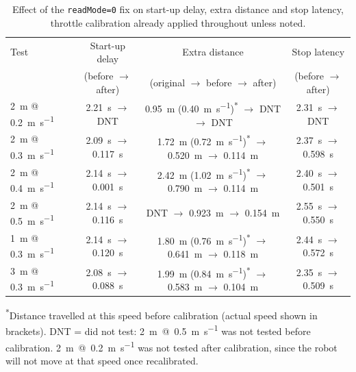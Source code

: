 \begin{table}[htbp]
  \centering
  \caption{Effect of the \texttt{readMode=0} fix on start-up delay, extra distance and stop latency, throttle calibration already applied throughout unless noted.}
  \label{tab:readmode-fix}
  \begin{tabular}{@{}lccc@{}}
    \toprule
    Test & Start-up delay & Extra distance & Stop latency \\
    & (before $\to$ after) & (original $\to$ before $\to$ after) & (before $\to$ after) \\
    \midrule
    \SI{2}{\meter} @ \SI{0.2}{\meter\per\second} & \SI{2.21}{\second} $\to$ DNT & \SI{0.95}{\meter} (\SI{0.40}{\meter\per\second})\textsuperscript{*} $\to$ DNT $\to$ DNT & \SI{2.31}{\second} $\to$ DNT \\
    \SI{2}{\meter} @ \SI{0.3}{\meter\per\second} & \SI{2.09}{\second} $\to$ \SI{0.117}{\second} & \SI{1.72}{\meter} (\SI{0.72}{\meter\per\second})\textsuperscript{*} $\to$ \SI{0.520}{\meter} $\to$ \SI{0.114}{\meter} & \SI{2.37}{\second} $\to$ \SI{0.598}{\second} \\
    \SI{2}{\meter} @ \SI{0.4}{\meter\per\second} & \SI{2.14}{\second} $\to$ \SI{0.001}{\second} & \SI{2.42}{\meter} (\SI{1.02}{\meter\per\second})\textsuperscript{*} $\to$ \SI{0.790}{\meter} $\to$ \SI{0.114}{\meter} & \SI{2.40}{\second} $\to$ \SI{0.501}{\second} \\
    \SI{2}{\meter} @ \SI{0.5}{\meter\per\second} & \SI{2.14}{\second} $\to$ \SI{0.116}{\second} & DNT $\to$ \SI{0.923}{\meter} $\to$ \SI{0.154}{\meter} & \SI{2.55}{\second} $\to$ \SI{0.550}{\second} \\
    \SI{1}{\meter} @ \SI{0.3}{\meter\per\second} & \SI{2.14}{\second} $\to$ \SI{0.120}{\second} & \SI{1.80}{\meter} (\SI{0.76}{\meter\per\second})\textsuperscript{*} $\to$ \SI{0.641}{\meter} $\to$ \SI{0.118}{\meter} & \SI{2.44}{\second} $\to$ \SI{0.572}{\second} \\
    \SI{3}{\meter} @ \SI{0.3}{\meter\per\second} & \SI{2.08}{\second} $\to$ \SI{0.088}{\second} & \SI{1.99}{\meter} (\SI{0.84}{\meter\per\second})\textsuperscript{*} $\to$ \SI{0.583}{\meter} $\to$ \SI{0.104}{\meter} & \SI{2.35}{\second} $\to$ \SI{0.509}{\second} \\
    \bottomrule
  \end{tabular}

  \vspace{2pt}
  \raggedright\footnotesize\textsuperscript{*}Distance travelled at
  this speed before calibration (actual speed shown in brackets).
  DNT = did not test: \SI{2}{\meter}~@~\SI{0.5}{\meter\per\second}
  was not tested before calibration. \SI{2}{\meter}~@~\SI{0.2}{\meter\per\second}
  was not tested after calibration, since the robot will not move
  at that speed once recalibrated.
\end{table}

